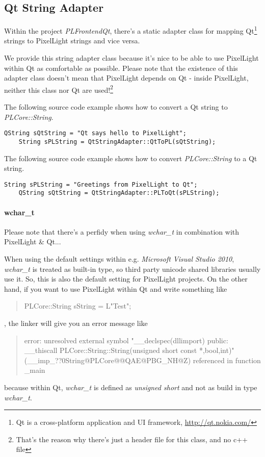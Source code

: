 \subsection{Qt String Adapter}
Within the project \emph{PLFrontendQt}, there's a static adapter class for mapping Qt\footnote{Qt is a cross-platform application and UI framework, \url{http://qt.nokia.com/}} strings to PixelLight strings and vice versa.

We provide this string adapter class because it's nice to be able to use PixelLight within Qt as comfortable as possible. Please note that the existence of this adapter class doesn't mean that PixelLight depends on Qt - inside PixelLight, neither this class nor Qt are used!\footnote{That's the reason why there's just a header file for this class, and no c++ file}

The following source code example shows how to convert a Qt string to \emph{PLCore::String}.
\begin{lstlisting}[caption=Qt string to PLCore::String]
	QString sQtString = "Qt says hello to PixelLight";
	String sPLString = QtStringAdapter::QtToPL(sQtString);
\end{lstlisting}

The following source code example shows how to convert \emph{PLCore::String} to a Qt string.
\begin{lstlisting}[caption=PLCore::String string to Qt]
	String sPLString = "Greetings from PixelLight to Qt";
	QString sQtString = QtStringAdapter::PLToQt(sPLString);
\end{lstlisting}


\paragraph{wchar\_t}
Please note that there's a perfidy when using \emph{wchar\_t} in combination with PixelLight \& Qt...

When using the default settings within e.g. \emph{Microsoft Visual Studio 2010}, \emph{wchar\_t} is treated as built-in type, so third party unicode shared libraries usually use it. So, this is also the default setting for PixelLight projects. On the other hand, if you want to use PixelLight within Qt and write something like \begin{quote}PLCore::String sString = L"Test";\end{quote}, the linker will give you an error message like \begin{quote}error:  unresolved external symbol "\_\_declspec(dllimport) public: \_\_thiscall PLCore::String::String(unsigned short const *,bool,int)" (\_\_imp\_??0String@PLCore@@QAE@PBG\_NH@Z) referenced in function \_main\end{quote} because within Qt, \emph{wchar\_t} is defined as \emph{unsigned short} and not as build in type \emph{wchar\_t}.

